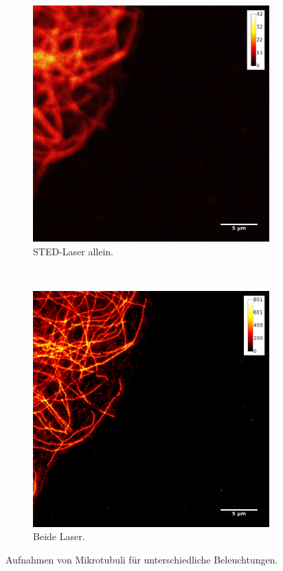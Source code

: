\begin{figure}
\begin{subfigure}{0.3\textwidth}
	\includegraphics[width=\textwidth]{plots/normal_onlySTED_measurement_with_bar.jpg}
	\caption{STED-Laser allein.}\label{fig:onlysted}
\end{subfigure}
~
\begin{subfigure}{0.3\textwidth}
	\includegraphics[width=\textwidth]{plots/normal_STED_measurement_with_bar.jpg}
	\caption{Beide Laser.}\label{fig:tubuli_sted}
\end{subfigure}
\caption{Aufnahmen von Mikrotubuli für unterschiedliche Beleuchtungen.}
\end{figure}
